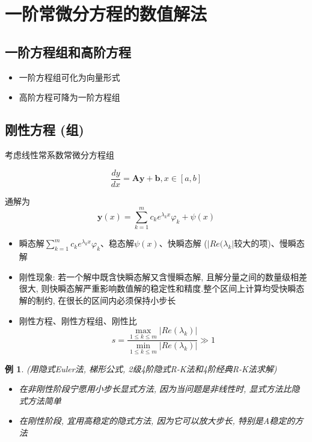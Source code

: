 \documentclass[twoside]{article}
\newtheorem{eg}{例}[section]
\begin{document}
\section{一阶常微分方程的数值解法}
\subsection{一阶方程组和高阶方程}
\begin{itemize}
  \item 一阶方程组可化为向量形式
  \item 高阶方程可降为一阶方程组
\end{itemize}
\subsection{刚性方程 (组)}
考虑线性常系数常微分方程组

\begin{equation}
  \frac{dy}{dx} = \mathbf{Ay} + \mathbf{b}, x\in[a,b]
\end{equation}

通解为
\begin{equation}
  \mathbf{y}(x) = \sum_{k=1}^m c_k e^{\lambda_k x} \varphi _k + \psi(x)
\end{equation}
\begin{itemize}
  \item 瞬态解$\sum_{k=1}^m c_k e^{\lambda_k x} \varphi _k$、稳态解$\psi(x)$、快瞬态解 ($|Re(\lambda_k|$较大的项)、慢瞬态解
  \item 刚性现象: 若一个解中既含快瞬态解又含慢瞬态解, 且解分量之间的数量级相差很大, 则快瞬态解严重影响数值解的稳定性和精度.整个区间上计算均受快瞬态解的制约, 在很长的区间内必须保持小步长
  \item 刚性方程、刚性方程组、刚性比
    \begin{equation}
      s = \frac{\max_{1\le k\le m}{|Re(\lambda_k)|}}{\min_{1\le k\le m}{|Re(\lambda_k)|}} \gg 1
    \end{equation}
\end{itemize}
\begin{eg}
  (用隐式Euler法, 梯形公式, 2级4阶隐式R-K法和4阶经典R-K法求解)
  \begin{itemize}
    \item 在非刚性阶段宁愿用小步长显式方法, 因为当问题是非线性时, 显式方法比隐式方法简单
    \item 在刚性阶段, 宜用高稳定的隐式方法, 因为它可以放大步长, 特别是A稳定的方法
  \end{itemize}
\end{eg}
\end{document}
